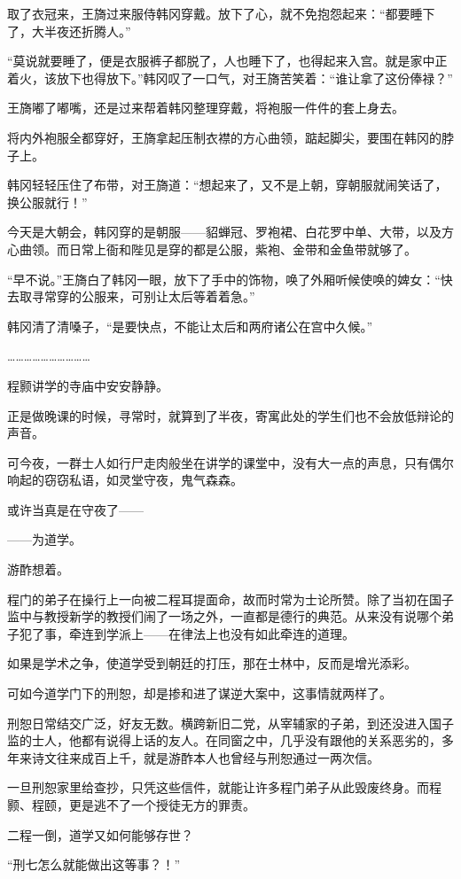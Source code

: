 取了衣冠来，王旖过来服侍韩冈穿戴。放下了心，就不免抱怨起来：“都要睡下了，大半夜还折腾人。”

“莫说就要睡了，便是衣服裤子都脱了，人也睡下了，也得起来入宫。就是家中正着火，该放下也得放下。”韩冈叹了一口气，对王旖苦笑着：“谁让拿了这份俸禄？”

王旖嘟了嘟嘴，还是过来帮着韩冈整理穿戴，将袍服一件件的套上身去。

将内外袍服全都穿好，王旖拿起压制衣襟的方心曲领，踮起脚尖，要围在韩冈的脖子上。

韩冈轻轻压住了布带，对王旖道：“想起来了，又不是上朝，穿朝服就闹笑话了，换公服就行！”

今天是大朝会，韩冈穿的是朝服——貂蝉冠、罗袍裙、白花罗中单、大带，以及方心曲领。而日常上衙和陛见是穿的都是公服，紫袍、金带和金鱼带就够了。

“早不说。”王旖白了韩冈一眼，放下了手中的饰物，唤了外厢听候使唤的婢女：“快去取寻常穿的公服来，可别让太后等着着急。”

韩冈清了清嗓子，“是要快点，不能让太后和两府诸公在宫中久候。”

…………………………

程颢讲学的寺庙中安安静静。

正是做晚课的时候，寻常时，就算到了半夜，寄寓此处的学生们也不会放低辩论的声音。

可今夜，一群士人如行尸走肉般坐在讲学的课堂中，没有大一点的声息，只有偶尔响起的窃窃私语，如灵堂守夜，鬼气森森。

或许当真是在守夜了——

——为道学。

游酢想着。

程门的弟子在操行上一向被二程耳提面命，故而时常为士论所赞。除了当初在国子监中与教授新学的教授们闹了一场之外，一直都是德行的典范。从来没有说哪个弟子犯了事，牵连到学派上——在律法上也没有如此牵连的道理。

如果是学术之争，使道学受到朝廷的打压，那在士林中，反而是增光添彩。

可如今道学门下的刑恕，却是掺和进了谋逆大案中，这事情就两样了。

刑恕日常结交广泛，好友无数。横跨新旧二党，从宰辅家的子弟，到还没进入国子监的士人，他都有说得上话的友人。在同窗之中，几乎没有跟他的关系恶劣的，多年来诗文往来成百上千，就是游酢本人也曾经与刑恕通过一两次信。

一旦刑恕家里给查抄，只凭这些信件，就能让许多程门弟子从此毁废终身。而程颢、程颐，更是逃不了一个授徒无方的罪责。

二程一倒，道学又如何能够存世？

“刑七怎么就能做出这等事？！”

